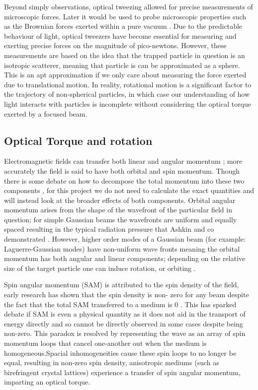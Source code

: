 Beyond simply observations, optical tweezing allowed for precise 
measurements of microscopic forces. Later it would be used to probe microscopic properties such as the Brownian forces exerted within a 
pure vacuum \cite{Ahn2018, Monteiro2018}. Due to the predictable 
behaviour of light, optical tweezers have become essential for 
measuring and exerting precise forces on the magnitude of pico-newtons.
However, these measurements are based on the idea that the trapped 
particle in question is an isotropic scatterer, meaning that particle 
is can be approximated as a sphere. This is an apt approximation if 
we only care about measuring the force exerted due to translational 
motion. In reality, rotational motion is a significant factor to the 
trajectory of non-spherical particles, in which case our understanding
of how light interacts with particles is incomplete without considering
the optical torque exerted by a focused beam.

\subsection{Optical Torque and rotation}
\label{sec:opt_torque}
Electromagnetic fields can transfer both linear and angular momentum \cite{Beth1936MechanicalDA}; more accurately the field is said to have 
both orbital and spin momentum. Though there is some debate on how to decompose the total momentum into these two components \cite{Bruce2020, Svak2018}, for this project we do not need to calculate the exact 
quantities and will instead look at the broader effects of both 
components. Orbital angular momentum arises from the shape of the 
wavefront of the particular field in question; for simple Gaussian 
beams the wavefronts are uniform and equally spaced resulting in the 
typical radiation pressure that Ashkin and co demonstrated 
\cite{Ashkin1980}. However, higher order modes of a Gaussian beam (for example: Laguerre-Gaussian modes) have non-uniform wave fronts meaning 
the orbital momentum has both angular and linear components; depending 
on the relative size of the target particle one can induce rotation, 
or orbiting \cite{Bruce2020, Courtial2000}. 

Spin angular momentum (SAM) is attributed to the spin density of 
the field, early research has shown that the spin density is non-
zero for any beam despite the fact that the total SAM transferred 
to a medium is 0 \cite{Svak2018, Bliokh2014}. This has sparked 
debate if SAM is even a physical quantity as it does not aid in 
the transport of energy directly \cite{Bliokh2014} and so cannot 
be directly observed in some cases despite being non-zero. This 
paradox is resolved by representing the wave as an array of spin 
momentum loops that cancel one-another out when the medium is 
homogeneous.Spacial inhomogeneities cause these spin loops to no 
longer be equal, resulting in non-zero spin density, anisotropic 
mediums (such as birefringent crystal lattices) experience a 
transfer of spin angular momentum, imparting an optical torque.

